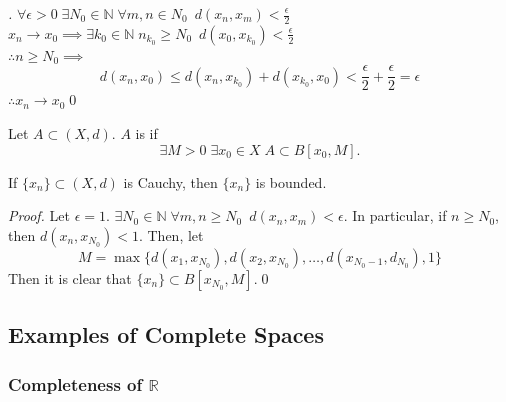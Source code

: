 \documentclass[notoc,notitlepage]{tufte-book}
\begin{document}
\begin{proof}[\vvimponote]
  $\forall \epsilon > 0 \; \exists N_0 \in \mathbb{N} \; \forall m, n \in N_0 \enspace d(x_n, x_m) < \frac{\epsilon}{2}$ \\
  \noindent $x_n \to x_0 \implies \exists k_0 \in \mathbb{N} \; n_{k_0} \geq N_0 \enspace d(x_0, x_{k_0}) < \frac{\epsilon}{2}$ \\
  \noindent$\therefore n \geq N_0 \implies$
  \begin{equation*}
    d(x_n, x_0) \leq d(x_n, x_{k_0}) + d(x_{k_0}, x_0)< \frac{\epsilon}{2} + \frac{\epsilon}{2} = \epsilon
  \end{equation*}
  \noindent$\therefore x_n \to x_0$\qed\
\end{proof}

\begin{defn}[Boundedness]\label{defn:boundedness}
  Let $A \subset (X, d)$. $A$ is \hlnoteb{bounded} if
  \begin{equation*}
    \exists M > 0 \; \exists x_0 \in X \; A \subset B[x_0, M].
  \end{equation*}
\end{defn}

\begin{propo}\label{propo:cauchy_sequences_are_bounded}
  If $\{ x_n \} \subset (X, d)$ is Cauchy, then $\{ x_n \}$ is bounded.
\end{propo}

\begin{proof}
  Let $\epsilon = 1$. $\exists N_0 \in \mathbb{N} \; \forall m, n \geq N_0 \enspace d(x_n, x_m) < \epsilon$. In particular, if $n \geq N_0$, then $d(x_n, x_{N_0}) < 1$. Then, let
  \begin{equation*}
    M = \max \{ d\left(x_1, x_{N_0}\right), d\left(x_2, x_{N_0}\right), \ldots, d\left(x_{N_0 - 1}, d_{N_0}\right), 1 \}
  \end{equation*}
  Then it is clear that $\{ x_n \} \subset B[x_{N_0}, M]$.\qed\
\end{proof}


\subsection{Examples of Complete Spaces}%
\label{sub:examples_of_complete_spaces}

\subsubsection{Completeness of $\mathbb{R}$}%
\label{ssub:completeness_of_r_}
\end{document}
